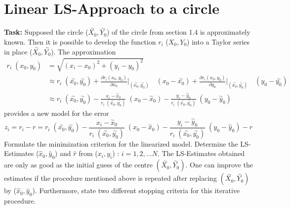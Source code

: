 \section{Linear LS-Approach to a circle}
\noindent \textbf{Task:} Supposed the circle ($\overset{\sim}{X_0}, \overset{\sim}{Y_0} $) of the circle from section 1.4 is approximately known. Then it is possible to develop the function $r_i$ ($X_0,Y_0$) into a Taylor series in place  ($\overset{\sim}{X_0}, \overset{\sim}{Y_0} $). The approximation
\begin{equation*} 
\begin{split}
 r_i\;(x_0,y_0) &= \sqrt{(x_i - x_0)^2 + (y_i - y_0)^2} \\
 & \approx r_i\;(\overset{\sim}{x_0}, \overset{\sim}{y_0}) + \frac{\partial r_i (x_0,y_0)}{\partial x_0}\Bigg|_{ (\overset{\sim}{x_0}, \overset{\sim}{y_0} )} \quad ({x_0} - \overset{\sim}{x_0}) + \frac{\partial r_i (x_0,y_0)}{\partial y_0}\Bigg|_{ (\overset{\sim}{x_0}, \overset{\sim}{y_0} )} \quad ({y_0} - \overset{\sim}{y_0}) \\
  & \approx r_i\;(\overset{\sim}{x_0}, \overset{\sim}{y_0}) - \frac{x_i - \overset{\sim}{x}_0}{  r_i\;(\overset{\sim}{x_0}, \overset{\sim}{y_0})}\;(x_0 - \overset{\sim}{x}_0) - \frac{y_i - \overset{\sim}{y}_0}{ r_i\;(\overset{\sim}{x_0}, \overset{\sim}{y_0})}\;(y_0 - \overset{\sim}{y}_0) 
\end{split}
\end{equation*}
\noindent provides a new model for the error
$$ z_i = r_i - r =r_i\;(\overset{\sim}{x_0}, \overset{\sim}{y_0}) - \frac{x_i - \overset{\sim}{x}_0}{  r_i\;(\overset{\sim}{x_0}, \overset{\sim}{y_0})}\;(x_0 - \overset{\sim}{x}_0) - \frac{y_i - \overset{\sim}{y}_0}{ r_i\;(\overset{\sim}{x_0}, \overset{\sim}{y_0})}\;(y_0 - \overset{\sim}{y}_0) - r $$
\noindent Formulate the minimization criterion for the linearized model. Determine the LS-Estimates ($\hat{x}_0, \hat{y}_0$) and $\hat{r}$ from ($x_i,y_i$) : $i = 1,2,...N.$ The LS-Estimates obtained are only as good as the initial guess of the centre $(\overset{\sim}{X_0}, \overset{\sim}{Y_0}).$ One can improve the estimates if the procedure mentioned above is repeated after replacing $(\overset{\sim}{X_0}, \overset{\sim}{Y_0})$ by  ($\hat{x}_0, \hat{y}_0$). Furthermore, state two different stopping criteria
for this iterative procedure.

\newpage

